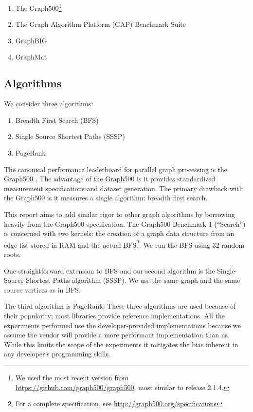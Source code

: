 \documentclass{llncs}
\begin{document}
\begin{enumerate}
	\item The Graph500\footnote{We used the most recent version from \url{https://github.com/graph500/graph500}, most similar to release 2.1.4.} \cite{Murphy:2010:Graph500}
	\item The Graph Algorithm Platform (GAP) Benchmark Suite \cite{Beamer:2015:GAPBench}
	\item GraphBIG \cite{Nai:2015:Graphbig}
	\item GraphMat \cite{Sundaram:2015:GraphMat}
\end{enumerate}

\subsection{Algorithms}

We consider three algorithms:

\begin{enumerate}
	\item Breadth First Search (BFS)
	\item Single Source Shortest Paths (SSSP)
	\item PageRank
\end{enumerate}

The canonical performance leaderboard for parallel graph processing is the Graph500 \cite{Murphy:2010:Graph500}. The advantage of the Graph500 is it provides standardized measurement specifications and dataset generation. The primary drawback with the Graph500 is it measures a single algorithm: breadth first search.

This report aims to add similar rigor to other graph algorithms by borrowing heavily from the Graph500 specification. The Graph500 Benchmark 1 (``Search'') is concerned with two kernels: the creation of a graph data structure from an edge list stored in RAM and the actual BFS\footnote{For a complete specification, see \url{http://graph500.org/specifications}}. We run the BFS using 32 random roots.

One straightforward extension to BFS and our second algorithm is the Single-Source Shortest Paths algorithm (SSSP). We use the same graph and the same source vertices as in BFS.

The third algorithm is PageRank. These three algorithms are used because of their popularity; most libraries provide reference implementations. All the experiments performed use the developer-provided implementations because we assume the vendor will provide a more performant implementation than us. While this limits the scope of the experiments it mitigates the bias inherent in any developer's programming skills.
\end{document}
